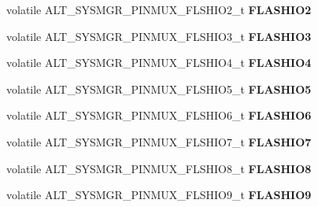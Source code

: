 \begin{DoxyCompactItemize}
\item 
\mbox{\label{structALT__SYSMGR__PINMUX__s_a479b15419eb39c2ab036c94fdbd965ef}} 
volatile A\+L\+T\+\_\+\+S\+Y\+S\+M\+G\+R\+\_\+\+P\+I\+N\+M\+U\+X\+\_\+\+F\+L\+S\+H\+I\+O2\+\_\+t {\bfseries F\+L\+A\+S\+H\+I\+O2}
\item 
\mbox{\label{structALT__SYSMGR__PINMUX__s_aa3abd26286d9de0537bda8b8f0933cb5}} 
volatile A\+L\+T\+\_\+\+S\+Y\+S\+M\+G\+R\+\_\+\+P\+I\+N\+M\+U\+X\+\_\+\+F\+L\+S\+H\+I\+O3\+\_\+t {\bfseries F\+L\+A\+S\+H\+I\+O3}
\item 
\mbox{\label{structALT__SYSMGR__PINMUX__s_a27aee7d36f97bb5c3b2af2a2170e555e}} 
volatile A\+L\+T\+\_\+\+S\+Y\+S\+M\+G\+R\+\_\+\+P\+I\+N\+M\+U\+X\+\_\+\+F\+L\+S\+H\+I\+O4\+\_\+t {\bfseries F\+L\+A\+S\+H\+I\+O4}
\item 
\mbox{\label{structALT__SYSMGR__PINMUX__s_ad6fc6b8fc4052d984a4ebf05b4300c50}} 
volatile A\+L\+T\+\_\+\+S\+Y\+S\+M\+G\+R\+\_\+\+P\+I\+N\+M\+U\+X\+\_\+\+F\+L\+S\+H\+I\+O5\+\_\+t {\bfseries F\+L\+A\+S\+H\+I\+O5}
\item 
\mbox{\label{structALT__SYSMGR__PINMUX__s_a165492678d4c40b3e394421138c92efb}} 
volatile A\+L\+T\+\_\+\+S\+Y\+S\+M\+G\+R\+\_\+\+P\+I\+N\+M\+U\+X\+\_\+\+F\+L\+S\+H\+I\+O6\+\_\+t {\bfseries F\+L\+A\+S\+H\+I\+O6}
\item 
\mbox{\label{structALT__SYSMGR__PINMUX__s_a96aa17db616a691967a2decea8ae46e0}} 
volatile A\+L\+T\+\_\+\+S\+Y\+S\+M\+G\+R\+\_\+\+P\+I\+N\+M\+U\+X\+\_\+\+F\+L\+S\+H\+I\+O7\+\_\+t {\bfseries F\+L\+A\+S\+H\+I\+O7}
\item 
\mbox{\label{structALT__SYSMGR__PINMUX__s_a2f96bb8eebbf638bb68c28042985eea7}} 
volatile A\+L\+T\+\_\+\+S\+Y\+S\+M\+G\+R\+\_\+\+P\+I\+N\+M\+U\+X\+\_\+\+F\+L\+S\+H\+I\+O8\+\_\+t {\bfseries F\+L\+A\+S\+H\+I\+O8}
\item 
\mbox{\label{structALT__SYSMGR__PINMUX__s_aee1869e4382f0a149ee5ea72096520f7}} 
volatile A\+L\+T\+\_\+\+S\+Y\+S\+M\+G\+R\+\_\+\+P\+I\+N\+M\+U\+X\+\_\+\+F\+L\+S\+H\+I\+O9\+\_\+t {\bfseries F\+L\+A\+S\+H\+I\+O9}

\end{DoxyCompactItemize}
